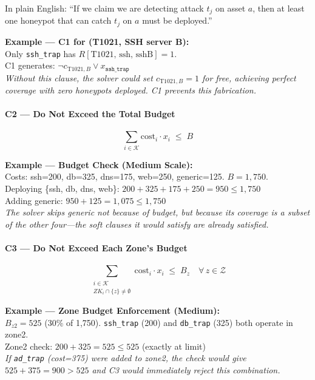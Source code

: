 \documentclass[journal]{IEEEtran}
\newcommand{\calK}{\mathcal{K}}
\newcommand{\calZ}{\mathcal{Z}}
\begin{document}
In plain English: ``If we claim we are detecting attack
$t_j$ on asset $a$, then at least one honeypot that can
catch $t_j$ on $a$ must be deployed.''

\begin{examplebox}
\textbf{Example --- C1 for (T1021, SSH server B):}\\[3pt]
Only \texttt{ssh\_trap} has $R[\text{T1021, ssh, sshB}]=1$.\\
C1 generates: $\neg c_{\text{T1021},B}
\vee x_{\texttt{ssh\_trap}}$\\[3pt]
\textit{Without this clause, the solver could set
$c_{\text{T1021},B}=1$ for free, achieving perfect coverage
with zero honeypots deployed.
C1 prevents this fabrication.}
\end{examplebox}

\paragraph{C2 --- Do Not Exceed the Total Budget}
\begin{equation}
  \sum_{i \in \calK} \mathrm{cost}_i \cdot x_i \;\leq\; B
\end{equation}

\begin{examplebox}
\textbf{Example --- Budget Check (Medium Scale):}\\[3pt]
Costs: ssh=200, db=325, dns=175, web=250, generic=125.
$B=1{,}750$.\\
Deploying \{ssh, db, dns, web\}:
$200+325+175+250=950 \leq 1{,}750$ \checkmark\\
Adding generic: $950+125=1{,}075 \leq 1{,}750$ \checkmark\\
\textit{The solver skips generic not because of budget, but
because its coverage is a subset of the other four---the
soft clauses it would satisfy are already satisfied.}
\end{examplebox}

\paragraph{C3 --- Do Not Exceed Each Zone's Budget}
\begin{equation}
  \sum_{\substack{i \in \calK \\ ZK_i \cap \{z\} \neq \emptyset}}
  \mathrm{cost}_i \cdot x_i \;\leq\; B_z
  \quad \forall\, z \in \calZ
\end{equation}

\begin{examplebox}
\textbf{Example --- Zone Budget Enforcement (Medium):}\\[3pt]
$B_{z2}=525$ (30\% of 1,750). \texttt{ssh\_trap} (200) and
\texttt{db\_trap} (325) both operate in zone2.\\
Zone2 check: $200+325=525 \leq 525$ \checkmark (exactly at limit)\\
\textit{If \texttt{ad\_trap} (cost=375) were added to zone2,
the check would give $525+375=900 > 525$ and C3 would
immediately reject this combination.}
\end{examplebox}
\end{document}
